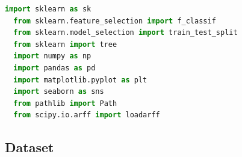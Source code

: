 \documentclass{article}
\begin{document}
\begin{lstlisting}[language=Python, caption=Python example]
  import sklearn as sk
  from sklearn.feature_selection import f_classif
  from sklearn.model_selection import train_test_split
  from sklearn import tree
  import numpy as np
  import pandas as pd
  import matplotlib.pyplot as plt
  import seaborn as sns
  from pathlib import Path
  from scipy.io.arff import loadarff
\end{lstlisting}

\subsection{Dataset}

\begin{lstlisting}[language=Python, caption=Python example]
  
\end{lstlisting}
\end{document}

